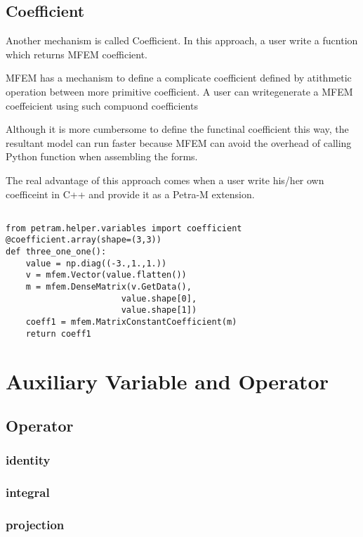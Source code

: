 \documentclass[11pt,a4paper,draft]{report}
\begin{document}
\subsection{Coefficient}
Another mechanism is called Coefficient. 
In this approach, a user write a fucntion which returns MFEM coefficient. 

MFEM has a mechanism to define a complicate coefficient defined by atithmetic operation between more primitive coefficient. 
A user can writegenerate a MFEM coeffeicient using such compuond coefficients

Although it is more cumbersome to define the functinal coefficient this way, the resultant model can run faster because MFEM can avoid the overhead of calling Python function when assembling the forms.

The real advantage of this approach comes when a user write his/her own coefficeint in C++ and provide it as a Petra-M extension.  


\begin{minipage}[c]{0.95\textwidth}
\begin{lstlisting}[caption={A user defined generic preconditioner},captionpos=b, frame=single, label={function1}]

from petram.helper.variables import coefficient
@coefficient.array(shape=(3,3))
def three_one_one():
    value = np.diag((-3.,1.,1.))
    v = mfem.Vector(value.flatten())
    m = mfem.DenseMatrix(v.GetData(), 
                       value.shape[0], 
                       value.shape[1])       
    coeff1 = mfem.MatrixConstantCoefficient(m)
    return coeff1

\end{lstlisting}
 \end{minipage}
 
\section{Auxiliary Variable and Operator}
\subsection{Operator}
\subsubsection{identity}            
\subsubsection{integral}
\subsubsection{projection}
\end{document}
